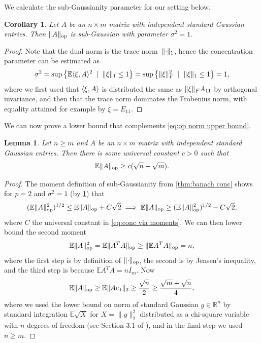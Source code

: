 \documentclass[aos]{imsart}
\newtheorem{corollary}[theorem]{Corollary}
\newtheorem{lemma}[theorem]{Lemma}
\theoremstyle{definition}
\numberwithin{equation}{section}
\DeclareMathOperator{\op}{op}
\DeclarePairedDelimiter{\norm}{\lVert}{\rVert}
\newcommand{\R}{{\mathbb{R}}}
\newcommand{\E}{\mathbb{E}}
\begin{document}
\begin{appendix}
We calculate the sub-Gaussianity parameter for our setting below.

\begin{corollary}\label{l:opNormSubG}
Let $A$ be an $n \times m$ matrix with independent standard Gaussian entries.
Then $\norm{A}_{\op}$ is sub-Gaussian with parameter $\sigma^{2} = 1$.
\end{corollary}
\begin{proof}
Note that the dual norm is the trace norm~$\norm{\cdot}_1$, hence the concentration parameter can be estimated as
\begin{align*}
  \sigma^2
= \sup \left\{ \E \langle \xi, A \rangle^2 \;\mid\; \norm{\xi}_1 \leq 1 \right\}
= \sup \left\{ \norm\xi_F^2 \;\mid\; \norm{\xi}_1 \leq 1 \right\}
= 1,
\end{align*}
where we first used that $\braket{\xi,A}$ is distributed the same as $\norm\xi_F A_{11}$ by orthogonal invariance, and then that the trace norm dominates the Frobenius norm, with equality attained for example by $\xi = E_{11}$.
\end{proof}

We can now prove a lower bound that complements \cref{eq:op norm upper bound}.

\begin{lemma}\label{lem:op norm lower bound}
Let $n \geq m$ and $A$ be an $n \times m$ matrix with independent standard Gaussian entries. Then there is some universal constant $c > 0$ such that
\begin{equation*}
  \E \norm{A}_{\op} \geq c (\sqrt{n} + \sqrt{m}).
\end{equation*}
\end{lemma}
\begin{proof}
The moment definition of sub-Gaussianity from \cref{thm:banach conc} shows for $p=2$ and $\sigma^{2} = 1$ (by \cref{l:opNormSubG}) that
\[
  (\E \norm{A}_{\op}^{2})^{1/2} \leq \E \norm{A}_{\op} + C \sqrt{2}
\implies \E \norm{A}_{\op} \geq (\E \norm{A}_{\op}^{2})^{1/2} - C \sqrt{2},
\]
where $C$ the universal constant in \cref{eq:conc via moments}.
We can then lower bound the second moment
\[ \E \norm{A}_{\op}^{2} = \E \norm{A^{T} A}_{\op} \geq \norm{\E A^{T} A}_{\op} = n ,  \]
where the first step is by definition of $\norm{\cdot}_{\op}$, the second is by Jensen's inequality, and the third step is because $\E A^{T} A = n I_{m}$. Now
\[ \E \norm{A}_{\op} \geq \E \norm{A e_{1}}_{2} \geq \frac{\sqrt{n}}{2} \geq \frac{\sqrt{m} + \sqrt{n}}{4}   ,  \]
where we used the lower bound on norm of standard Gaussian $g \in \R^{n}$ by standard integration $\E \sqrt{X}$ for $X = \|g\|_{2}^{2}$ distributed as a chi-square variable with $n$ degrees of freedom (see Section 3.1 of \cite{ENormLB}), and in the final step we used $n \geq m$. 
\end{proof}



\end{appendix}
\end{document}
